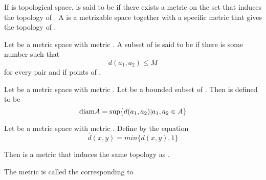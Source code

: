 \begin{definition}[metrizable]\label{def:Metrizable}
      If  is topological space,  is said to be  if there exists a metric  on the set  that induces the topology of . A \label{def:MetricSpace} is a metrizable space  together with a specific metric  that gives the topology of .
\end{definition}

\begin{definition}[bounded]\label{def:Bounded}
      Let  be a metric space with metric . A subset  of  is said to be  if there is some number  such that
      \begin{equation*}
            d(a_{1},a_{2}) \leq M
      \end{equation*}
      for every pair  and  if points of .
\end{definition}

\begin{definition}[diameter]\label{def:Diameter}
      Let  be a metric space with metric . Let  be a bounded subset of . Then  is defined to be
      \begin{equation*}
            \mathrm{diam} A = \sup\{
                  d(a_{1},a_{2}) | a_{1}, a_{2} \in A      
            \}
      \end{equation*}
\end{definition}

\begin{theorem}
      Let  be a metric space with metric . Define  by the equation
      \begin{equation*}
            \overline{d}(x,y) = min\{
                  d(x,y),1
            \}
      \end{equation*}

      Then  is a metric that induces the same topology as .

      The metric  is called the \label{def:StandardBoundedMetric} corresponding to 
\end{theorem}

